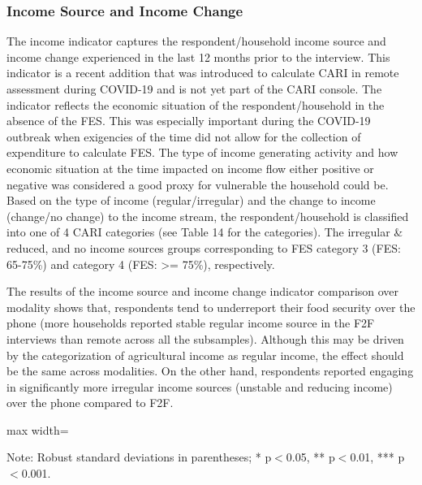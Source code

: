 \documentclass[11pt,harvard]{article}
\begin{document}
	\subsubsection{Income Source and Income Change}
	The income indicator captures the respondent/household income source and income change experienced in the last 12 months prior to the interview. This indicator is a recent addition that was introduced to calculate CARI in remote assessment during COVID-19 and is not yet part of the CARI console. The indicator reflects the economic situation of the respondent/household in the absence of the FES. This was especially important during the COVID-19 outbreak when exigencies of the time did not allow for the collection of expenditure to calculate FES. The type of income generating activity and how economic situation at the time impacted on income flow either positive or negative was considered a good proxy for vulnerable the household could be. Based on the type of income (regular/irregular) and the change to income (change/no change) to the income stream, the respondent/household is classified into one of 4 CARI categories (see Table 14 for the categories). The irregular \& reduced, and no income sources groups corresponding to FES category 3 (FES: 65-75\%) and category 4 (FES: >= 75\%), respectively.
	
	The results of the income source and income change indicator comparison over modality shows that, respondents tend to underreport their food security over the phone (more households reported stable regular income source in the F2F interviews than remote across all the subsamples). Although this may be driven by the categorization of agricultural income as regular income, the effect should be the same across modalities. On the other hand, respondents reported engaging in significantly more irregular income sources (unstable and reducing income) over the phone compared to F2F. 
	
	\begin{table}[htbp]
		\centering
		\begin{adjustbox}{max width=\textwidth}
			\begin{threeparttable}
				\caption{Impact of Survey Modality on Income}
				\scriptsize
				 
				\label{tab:INC_Modality_BF}
				\begin{tablenotes}
					\item Note: Robust standard deviations in parentheses; * p$<$0.05, ** p$<$0.01, *** p$<$0.001.
				\end{tablenotes}
			\end{threeparttable}
		\end{adjustbox}
	\end{table}
	
\end{document}
